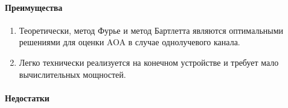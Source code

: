 
\paragraph{Преимущества}%
\begin{enumerate}
    \item Теоретически, метод Фурье и метод Бартлетта являются оптимальными
          решениями для оценки AOA в случае однолучевого канала.
    \item Легко технически реализуется на конечном устройстве и требует мало
          вычислительных мощностей.
\end{enumerate}

\paragraph{Недостатки}%

